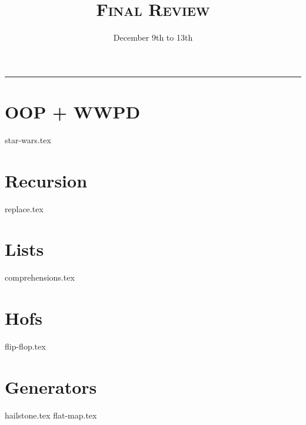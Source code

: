 \documentclass{exam}
\title{\textsc{Final Review}}
\date{December 9th to 13th}
\begin{document}
\maketitle
\rule{\textwidth}{0.15em}
\fontsize{12}{15}\selectfont


\begin{questions}

\section{OOP + WWPD}
{star-wars.tex}
\newpage
\newpage
\section{Recursion}
{replace.tex}
\newpage
\section{Lists}
{comprehensions.tex}
\newpage
\section{Hofs}
{flip-flop.tex}

\newpage
\section{Generators}
{hailstone.tex}
{flat-map.tex}



\end{questions}
\end{document}
